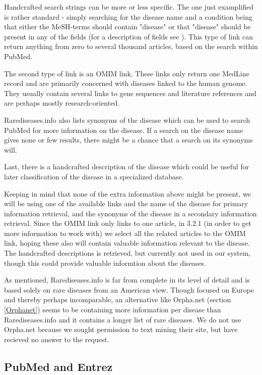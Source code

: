 Handcrafted search strings can be more or less specific. The one just
examplified is rather standard - simply searching for the disease name
and a condition being that either the MeSH-terms should contain
"disease" or that "disease" should be present in any of the fields
(for a description of fields see
\cite{PubMedHelpSearchFieldDescriptionsTags}). This type of link can
return anything from zero to several thousand articles, based on the
search within PubMed.

The second type of link is an OMIM link. These links only return one
MedLine record and are primarily concerned with diseases linked to the
human genome. They usually contain several links to gene sequences and
literature references and are perhaps mostly research-oriented.

Rarediseases.info also lists synonyms of the disease which can be used
to search PubMed for more information on the disease. If a search on
the disease name gives none or few results, there might be a chance
that a search on its synonyms will.

Last, there is a handcrafted description of the disease which could be
useful for later classification of the disease in a specialized
database.

Keeping in mind that none of the extra information above might be
present, we will be using one of the available links and the name of
the disease for primary information retrieval, and the synonyms of the
disease in a secondary information retrieval. Since the OMIM link only
links to one article, in 3.2.1  (in order to get more
information to work with) we select all the related articles to the
OMIM link, hoping these also will contain valuable information
relevant to the disease. The handcrafted descriptions is retrieved,
but currently not used in our system, though this could provide
valuable informtion about the diseases. 

As mentioned, Rarediseases.info is far from complete in its level of
detail and is based solely on rare diseases from an American
view. Though focused on Europe and thereby perhaps incomparable, an
alternative like Orpha.net (section \ref{Orphanet}) seems to be
containing more information per disease than Rarediseases.info and it
contains a longer list of rare diseases. We do not use Orpha.net
because we sought permission to text mining their site, but have
recieved no answer to the request.

\subsection{PubMed and Entrez\label{PubmedEntrez}}

